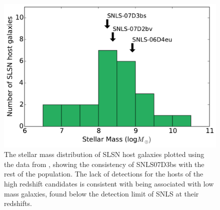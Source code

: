 \begin{figure}
\includegraphics[scale=0.5]{Figures/Chapter3/Galaxy}
\caption{The stellar mass distribution of SLSN host galaxies plotted using the data from \citet{Lunnan2014}, showing the consistency of SNLS07D3bs with the rest of the population. The lack of detections for the hosts of the high redshift candidates is consistent with being associated with low mass galaxies, found below the detection limit of SNLS at their redshifts.}
\label{fig:hosts}
\end{figure}
